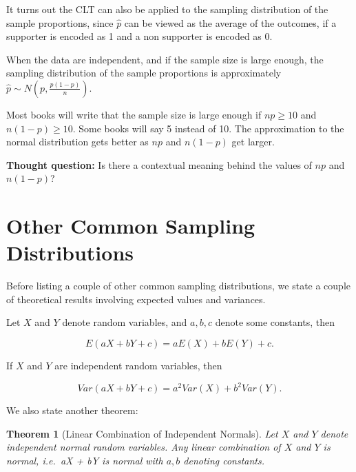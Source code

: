 \documentclass[
]{book}
\newtheorem{theorem}{Theorem}[chapter]
\theoremstyle{definition}
\theoremstyle{definition}
\theoremstyle{definition}
\theoremstyle{definition}
\theoremstyle{remark}
\begin{document}
It turns out the CLT can also be applied to the sampling distribution of the sample proportions, since \(\hat{p}\) can be viewed as the average of the outcomes, if a supporter is encoded as 1 and a non supporter is encoded as 0.

When the data are independent, and if the sample size is large enough, the sampling distribution of the sample proportions is approximately \(\hat{p} \sim N\left(p, \frac{p(1-p)}{n}\right)\).

Most books will write that the sample size is large enough if \(np \geq 10\) and \(n(1-p) \geq 10\). Some books will say 5 instead of 10. The approximation to the normal distribution gets better as \(np\) and \(n(1-p)\) get larger.

\textbf{Thought question:} Is there a contextual meaning behind the values of \(np\) and \(n(1-p)\)?

\hypertarget{other-common-sampling-distributions}{%
\section{Other Common Sampling Distributions}\label{other-common-sampling-distributions}}

Before listing a couple of other common sampling distributions, we state a couple of theoretical results involving expected values and variances.

Let \(X\) and \(Y\) denote random variables, and \(a,b,c\) denote some constants, then

\begin{equation} 
E(aX + bY + c) = aE(X) + bE(Y) + c.
\label{eq:11-expectations}
\end{equation}

If \(X\) and \(Y\) are independent random variables, then

\begin{equation} 
Var(aX + bY + c) = a^2 Var(X) + b^2 Var(Y).
\label{eq:11-variances}
\end{equation}

We also state another theorem:

\begin{theorem}[Linear Combination of Independent Normals]
\protect\hypertarget{thm:sum-norms}{}\label{thm:sum-norms}Let \(X\) and \(Y\) denote independent normal random variables. Any linear combination of \(X\) and \(Y\) is normal, i.e.~aX + bY is normal with \(a, b\) denoting constants.
\end{theorem}
\end{document}
